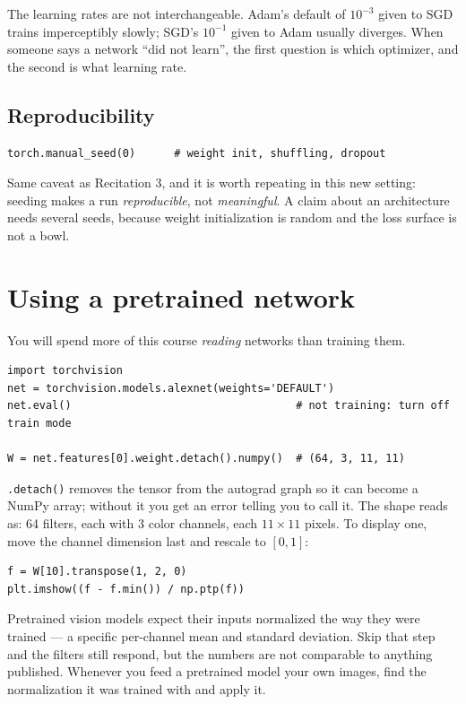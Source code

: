 \documentclass[11pt]{article}
\begin{document}
The learning rates are not interchangeable. Adam's default of $10^{-3}$ given to
SGD trains imperceptibly slowly; SGD's $10^{-1}$ given to Adam usually diverges.
When someone says a network ``did not learn'', the first question is which
optimizer, and the second is what learning rate.

\subsection{Reproducibility}

\begin{lstlisting}
torch.manual_seed(0)      # weight init, shuffling, dropout
\end{lstlisting}

Same caveat as Recitation 3, and it is worth repeating in this new setting:
seeding makes a run \emph{reproducible}, not \emph{meaningful}. A claim about an
architecture needs several seeds, because weight initialization is random and
the loss surface is not a bowl.

\section{Using a pretrained network}

You will spend more of this course \emph{reading} networks than training them.

\begin{lstlisting}
import torchvision
net = torchvision.models.alexnet(weights='DEFAULT')
net.eval()                                   # not training: turn off train mode

W = net.features[0].weight.detach().numpy()  # (64, 3, 11, 11)
\end{lstlisting}

\texttt{.detach()} removes the tensor from the autograd graph so it can become a
NumPy array; without it you get an error telling you to call it. The shape reads
as: 64 filters, each with 3 color channels, each $11\times11$ pixels. To display
one, move the channel dimension last and rescale to $[0,1]$:

\begin{lstlisting}
f = W[10].transpose(1, 2, 0)
plt.imshow((f - f.min()) / np.ptp(f))
\end{lstlisting}

Pretrained vision models expect their inputs normalized the way they were
trained --- a specific per-channel mean and standard deviation. Skip that step
and the filters still respond, but the numbers are not comparable to anything
published. Whenever you feed a pretrained model your own images, find the
normalization it was trained with and apply it.
\end{document}
